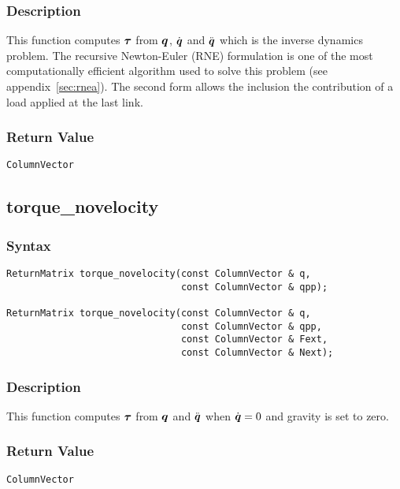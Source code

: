 \documentclass[11pt,fleqn,letterpaper]{report}
\newcommand{\mbold}[1]{\mbox{\boldmath $ #1 $}}
\begin{document}
\subsubsection*{Description}

This function computes $\mbold{\tau}$ from $\mbold{q}$,
$\dot{\mbold{q}}$ and $\ddot{\mbold{q}}$ which is the inverse dynamics
problem. The recursive Newton-Euler (RNE) formulation is one of the
most computationally efficient algorithm \cite{Luh80,Murray86} used to
solve this problem (see appendix~\ref{sec:rnea}). The second form
allows the inclusion the contribution of a load applied at the last link.


\subsubsection*{Return Value}

{\tt ColumnVector}

\newpage

\subsection*{torque\_novelocity}
\subsubsection*{Syntax}
\begin{verbatim}
ReturnMatrix torque_novelocity(const ColumnVector & q,
                               const ColumnVector & qpp);

ReturnMatrix torque_novelocity(const ColumnVector & q,
                               const ColumnVector & qpp,
                               const ColumnVector & Fext,
                               const ColumnVector & Next);
\end{verbatim}
\subsubsection*{Description}
This function computes $\mbold{\tau}$ from $\mbold{q}$ 
and $\ddot{\mbold{q}}$ when $\dot{\mbold{q}} = 0$ and gravity is set to zero.


\subsubsection*{Return Value}

{\tt ColumnVector}
\end{document}
